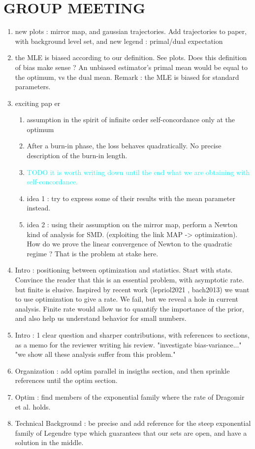 \documentclass[twoside]{article}
\let\oldsection\section
\renewcommand{\section}[1]{\oldsection{\texorpdfstring{\uppercase{#1}}{#1}}}
\newcommand{\TODO}[1]{\textcolor{cyan}{TODO #1}}
\begin{document}
\section{Group Meeting}
\begin{enumerate}
	\item new plots : mirror map, and gaussian trajectories. Add trajectories to paper, with background level set, and new legend : primal/dual expectation
	\item the MLE is biased according to our definition. See plots. Does this definition of bias make sense ? An unbiased estimator's primal mean would be equal to the optimum, vs the dual mean.  Remark : the MLE is biased for standard parameters.
	\item exciting pap er\citet{kakade2010learning}
	\begin{enumerate}
		\item assumption in the spirit of infinite order self-concordance only at the optimum
		\item After a burn-in phase, the loss behaves quadratically. No precise description of the burn-in length.
		\item \TODO{it is worth writing down until the end what we are obtaining with self-concordance.}
		\item idea 1 : try to express some of their results with the mean parameter instead.
		\item idea 2 : using their assumption on the mirror map, perform a Newton kind of analysis for SMD. (exploiting the link MAP -> optimization). How do we prove the linear convergence of Newton to the quadratic regime ? That is the problem at stake here.
	\end{enumerate}
	\item Intro : positioning between optimization and statistics. Start with stats. Convince the reader that this is an essential problem, with asymptotic rate. but finite is elusive. Inspired by recent work (lepriol2021 , bach2013) we want to use optimization to give a rate. We fail, but we reveal a hole in current analysis.  Finite rate would allow us to quantify the importance of the prior, and also help us understand behavior for small numbers. 
	\item Intro : 1 clear question and sharper contributions, with references to sections, as a memo for the reviewer writing his review. "investigate bias-variance..." "we show all these analysis suffer from this problem."
	\item Organization : add optim parallel in insigths section, and then sprinkle references until the optim section.
	\item Optim : find members of the exponential family where the rate of Dragomir et al. holds.
	\item Technical Background : be precise and add reference for the steep exponential family of Legendre type which guarantees that our sets are open, and have a solution in the middle.
\end{enumerate}
\end{document}
